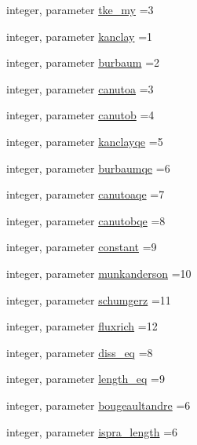 \begin{DoxyCompactItemize}
integer, parameter \mbox{\hyperlink{namespacemodulegotm_aed350ab9bde0bdf934d954e5c261a039}{tke\+\_\+my}} =3
\item 
integer, parameter \mbox{\hyperlink{namespacemodulegotm_abce18d4dc4ce96034c9b581092bd7970}{kanclay}} =1
\item 
integer, parameter \mbox{\hyperlink{namespacemodulegotm_a9ee68515a5fff9c9166a6b82ed456933}{burbaum}} =2
\item 
integer, parameter \mbox{\hyperlink{namespacemodulegotm_a08f200dfeb5a1b203cdf3f9887ec48f0}{canutoa}} =3
\item 
integer, parameter \mbox{\hyperlink{namespacemodulegotm_ac0ab48f659edad60f836fc9e986a8fec}{canutob}} =4
\item 
integer, parameter \mbox{\hyperlink{namespacemodulegotm_a2b67d69c6a8ac1632483b71fcbc9c20a}{kanclayqe}} =5
\item 
integer, parameter \mbox{\hyperlink{namespacemodulegotm_acc6f8d4ca9ecc05782e1e5fe37b2a4ea}{burbaumqe}} =6
\item 
integer, parameter \mbox{\hyperlink{namespacemodulegotm_a91892f852a1a0e7dbdd26d799d01d3c2}{canutoaqe}} =7
\item 
integer, parameter \mbox{\hyperlink{namespacemodulegotm_a1adf4ea0176bd82b7aa9864f7d8aaf83}{canutobqe}} =8
\item 
integer, parameter \mbox{\hyperlink{namespacemodulegotm_a4d0033e085531c87c93b030f6591c704}{constant}} =9
\item 
integer, parameter \mbox{\hyperlink{namespacemodulegotm_aefc13e1296f71005638e19eff270dd6a}{munkanderson}} =10
\item 
integer, parameter \mbox{\hyperlink{namespacemodulegotm_a8b80733c09f1d2f777468f16b9df9563}{schumgerz}} =11
\item 
integer, parameter \mbox{\hyperlink{namespacemodulegotm_a1844fb45e0887b6144045352f62f1af5}{fluxrich}} =12
\item 
integer, parameter \mbox{\hyperlink{namespacemodulegotm_a4403b4cce1e34ad86c1aa0e705d4222c}{diss\+\_\+eq}} =8
\item 
integer, parameter \mbox{\hyperlink{namespacemodulegotm_a090551467cbb9673b88edf6c5db10b2b}{length\+\_\+eq}} =9
\item 
integer, parameter \mbox{\hyperlink{namespacemodulegotm_a55510aacb7d64ac380e762ba61964376}{bougeaultandre}} =6
\item 
integer, parameter \mbox{\hyperlink{namespacemodulegotm_a8de26216ba29e73b224d20ca6cb44664}{ispra\+\_\+length}} =6
\end{DoxyCompactItemize}


